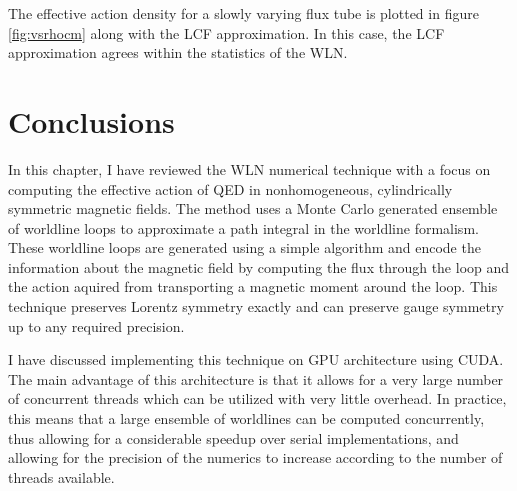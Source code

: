 The effective action density for a slowly varying flux tube is plotted in figure
\ref{fig:vsrhocm} along with the \ac{LCF} approximation. In this case, 
the \ac{LCF} approximation agrees within the statistics of the \ac{WLN}.



\section{Conclusions}

In this chapter, I have reviewed the \ac{WLN} numerical technique with a focus 
on computing the effective action of \ac{QED} in nonhomogeneous, cylindrically symmetric 
magnetic fields. The method uses a Monte Carlo generated ensemble of worldline loops 
to approximate a path integral in the worldline formalism. These worldline loops are 
generated using a simple algorithm and encode the information about the magnetic 
field by computing the flux through the loop and the action aquired from transporting a 
magnetic moment around the loop.
This technique preserves Lorentz symmetry exactly and can preserve 
gauge symmetry up to any required precision. 

I have discussed implementing this technique on \ac{GPU} architecture using 
\ac{CUDA}. The main advantage of this architecture is that it allows for a 
very large number of concurrent threads which can be utilized with 
very little overhead. In practice, this means that a large ensemble 
of worldlines can be computed concurrently, thus allowing for a considerable 
speedup over serial implementations, and allowing for the precision of the 
numerics to increase according to the number of threads available. 
